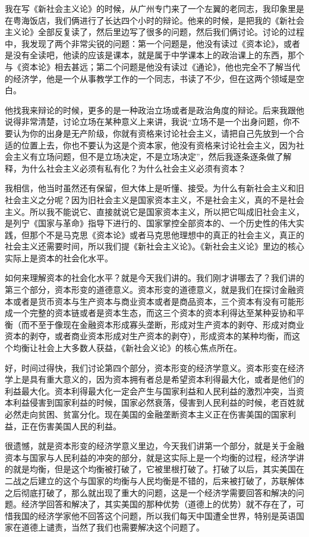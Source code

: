 \documentclass[UTF8, 12pt, a4paper]{ctexrep}
\begin{document}
我在写《新社会主义论》的时候，从广州专门来了一个左翼的老同志，我印象里是在粤海饭店，我们俩进行了长达四个小时的辩论。他来的时候，是把我的《新社会主义论》全部反复读了，然后里边写了很多的问题，然后我们俩讨论。讨论的过程中，我发现了两个非常尖锐的问题：第一个问题是，他没有读过《资本论》，或者是没有全读吧，他读的应该是课本，就是属于中学课本上的政治课上的东西，那个与《资本论》相去甚远；第二个问题是他没有读过《通论》，他也完全不了解当代的经济学，他是一个从事教学工作的一个同志，书读了不少，但在这两个领域是空白。

他找我来辩论的时候，更多的是一种政治立场或者是政治角度的辩论。后来我跟他说得非常清楚，讨论立场在某种意义上来讲，我说“立场不是一个出身问题，你不要认为你的出身是无产阶级，你就有资格来讨论社会主义，请把自己先放到一个合适的位置上去，你也不要认为这是个资本家，他没有资格来讨论社会主义，因为社会主义有立场问题，但不是立场决定，不是立场决定”，然后我逐条逐条做了解释，为什么社会主义必须有私有化？为什么社会主义必须有资本？

我相信，他当时虽然还有保留，但大体上是听懂、接受。为什么有新社会主义和旧社会主义之分呢？因为旧社会主义是国家资本主义，不是社会主义，真的不是社会主义。所以我不能说它、直接就说它是国家资本主义，所以把它叫成旧社会主义，是列宁《国家与革命》指导下进行的、国家掌控全部资本的、一个历史性的伟大实践，但那个不是马克思《资本论》或者马克思他理想中的真正的社会主义，真正的社会主义还需要时间，所以我们提《新社会主义论》。《新社会主义论》里边的核心实际上是资本的社会化水平。

如何来理解资本的社会化水平？就是今天我们讲的。我们刚才讲哪去了？我们讲的第三个部分，资本形变的道德意义。资本形变的道德意义，就是我们在探讨金融资本或者是货币资本与生产资本与商业资本或者是商品资本，三个资本有没有可能形成一个完整的资本链或者是资本生态，而这三个资本的资本利得达至某种妥协和平衡（而不至于像现在金融资本形成寡头垄断，形成对生产资本的剥夺、形成对商业资本的剥夺，或者商业资本形成对生产资本的剥夺），形成资本的某种均衡，而这个均衡让社会上大多数人获益，《新社会义论》的核心焦点所在。

好，时间过得快，我们讨论第四个部分，资本形变的经济学意义。资本形变在经济学上是具有重大意义的，因为资本拥有者总是希望资本利得最大化，或者是他们的利益最大化。资本利得最大化一定会产生与国家利益和人民利益的激烈冲突，当资本利益侵害到国家利益的时候，国家必然衰落，侵害到人民利益的时候，老百姓就必然走向贫困、贫富分化。现在美国的金融垄断资本主义正在伤害美国的国家利益，正在伤害美国人民的利益。

很遗憾，就是资本形变的经济学意义里边，今天我们讲第一个部分，就是关于金融资本与国家与人民利益的冲突的部分，就是这实际上是一个均衡的过程，经济学讲的就是均衡，但是这个均衡被打破了，它被里根打破了。打破了以后，其实美国在二战之后建立的这个与国家的均衡与人民均衡是不错的，后来被打破了，苏联解体之后彻底打破了，那么就出现了重大的问题，这是一个经济学需要回答和解决的问题。经济学回答和解决了，其实美国的那种优势（道德上的优势）就不存在了，可惜我国的经济学家他不回答这个问题，所以我们每天中国遭全世界，特别是英语国家在道德上谴责，当然了我们也需要解决这个问题了。
\end{document}
